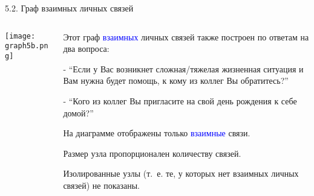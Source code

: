 \begin{frame}{5.2. Граф взаимных личных связей}

\begin{columns}
\begin{column}{0.75\textwidth} 
\centering
          \texttt{[image: graph5b.png]}
\end{column}
\begin{column}{0.25\textwidth} 
\tiny
Этот граф \textcolor{blue}{взаимных} личных связей также построен по ответам на два вопроса:
\smallskip

- ``Если у Вас возникнет сложная/тяжелая жизненная ситуация и Вам нужна будет помощь, к кому из коллег Вы обратитесь?''
\smallskip

- ``Кого из коллег Вы пригласите на свой день рождения к себе домой?''
\smallskip

На диаграмме отображены только \textcolor{blue}{взаимные} связи.
\smallskip

Размер узла пропорционален количеству связей.
\smallskip

Изолированные узлы (т.~е. те, у которых нет взаимных личных связей) не показаны.

\end{column}
\end{columns}
\end{frame}


